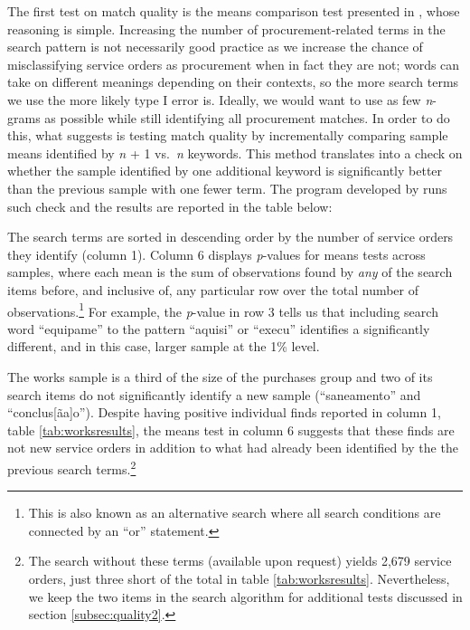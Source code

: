 \documentclass[11pt]{article}
\begin{document}
The first test on match quality is the means comparison test presented in \citet{AssumpcaotextfindDataDrivenText2018}, whose reasoning is simple. Increasing the number of procurement-related terms in the search pattern is not necessarily good practice as we increase the chance of misclassifying service orders as procurement when in fact they are not; words can take on different meanings depending on their contexts, so the more search terms we use the more likely type I error is. Ideally, we would want to use as few \emph{n}-grams as possible while still identifying all procurement matches. In order to do this, what \citet{AssumpcaotextfindDataDrivenText2018} suggests is testing match quality by incrementally comparing sample means identified by \emph{n} + 1 vs.~\emph{n} keywords. This method translates into a check on whether the sample identified by one additional keyword is significantly better than the previous sample with one fewer term. The program developed by \citet{AssumpcaotextfindDataDrivenText2018} runs such check and the results are reported in the table below:


The search terms are sorted in descending order by the number of service orders they identify (column 1). Column 6 displays \emph{p}-values for means tests across samples, where each mean is the sum of observations found by \emph{any} of the search items before, and inclusive of, any particular row over the total number of observations.\footnote{This is also known as an alternative search where all search conditions are connected by an ``or'' statement.} For example, the \emph{p}-value in row 3 tells us that including search word ``equipame'' to the pattern ``aquisi'' or ``execu'' identifies a significantly different, and in this case, larger sample at the 1\% level.

The works sample is a third of the size of the purchases group and two of its search items do not significantly identify a new sample (``saneamento'' and ``conclus{[}ãa{]}o''). Despite having positive individual finds reported in column 1, table \ref{tab:worksresults}, the means test in column 6 suggests that these finds are not new service orders in addition to what had already been identified by the the previous search terms.\footnote{The search without these terms (available upon request) yields 2,679 service orders, just three short of the total in table \ref{tab:worksresults}. Nevertheless, we keep the two items in the search algorithm for additional tests discussed in section \ref{subsec:quality2}.}

\end{document}
